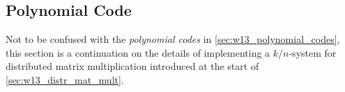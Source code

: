\subsection{Polynomial Code} \label{sec:w16_polynomial_code}

Not to be confused with the \textit{polynomial codes} in \autoref{sec:w13_polynomial_codes}, this section is a continuation on the details of implementing a $k/n$-system for distributed matrix multiplication introduced at the start of \autoref{sec:w13_distr_mat_mult}.